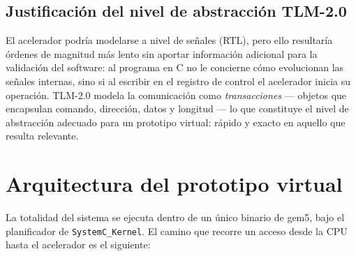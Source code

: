 \documentclass[11pt,letterpaper]{article}
\begin{document}
\subsection{Justificación del nivel de abstracción TLM-2.0}

El acelerador podría modelarse a nivel de señales (RTL), pero ello resultaría
órdenes de magnitud más lento sin aportar información adicional para la
validación del software: al programa en C no le concierne cómo evolucionan las
señales internas, sino si al escribir en el registro de control el acelerador
inicia su operación. TLM-2.0 modela la comunicación como \emph{transacciones}
--- objetos que encapsulan comando, dirección, datos y longitud --- lo que
constituye el nivel de abstracción adecuado para un prototipo virtual: rápido y
exacto en aquello que resulta relevante.

\section{Arquitectura del prototipo virtual}

La totalidad del sistema se ejecuta dentro de un único binario de gem5, bajo el
planificador de \texttt{SystemC\_Kernel}. El camino que recorre un acceso desde
la CPU hasta el acelerador es el siguiente:
\end{document}
